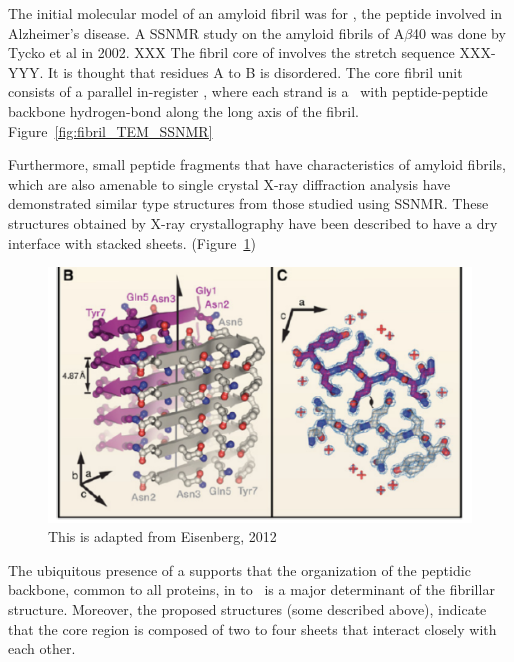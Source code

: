 
The initial molecular model of an amyloid fibril was for , the peptide involved in Alzheimer's disease.  A SSNMR study on the amyloid fibrils of A$\beta$40 was done by Tycko et al in 2002. XXX The fibril core of  involves the stretch sequence XXX-YYY. It is thought that residues A to B is disordered. The core fibril unit consists of a parallel in-register \bsheet, where each strand is a \bhairpin\ with peptide-peptide backbone hydrogen-bond along the long axis of the fibril. Figure~\ref{fig:fibril_TEM_SSNMR}


Furthermore, small peptide fragments that have characteristics of amyloid fibrils, which are also amenable to single crystal X-ray diffraction analysis have demonstrated similar type structures from those studied using SSNMR.  These structures obtained by X-ray crystallography have been described to have a dry interface with stacked sheets. (Figure~\ref{fig:fibril_xray_model})

\begin{figure}
  \centering
  \includegraphics[width=6in]{figures/introduction/fibril_xray_model.pdf}
  \caption[Characteristic cross-$\beta$ spacings from X-ray fibre diffraction studies of amyloid fibrils]{This is adapted from Eisenberg, 2012}
  \label{fig:fibril_xray_model}
\end{figure}

The ubiquitous presence of a \crossbs supports that the organization of the peptidic backbone, common to all proteins, in to \bsheets\ is a major determinant of the fibrillar structure. Moreover, the proposed structures (some described above), indicate that the core region is composed of two to four sheets that interact closely with each other.

